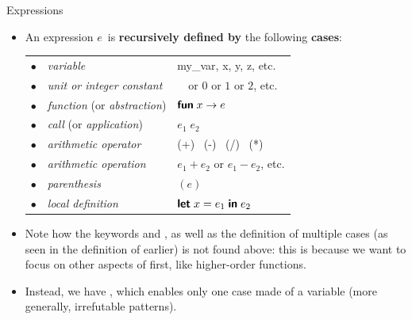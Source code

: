 %
\begin{frame}{Expressions}

  \begin{itemize}

    \item An expression \(e\)~is \textbf{recursively defined by} the
      following \textbf{cases}:

      \smallskip

      \begin{tabular}{@{\,}r@{\,\,}ll}
        $\bullet$
        & \emph{variable}
        & my\_var, x, y, z, etc. \\
        $\bullet$
        & \emph{unit or integer constant}
        & \unit \ or $0$ or $1$ or $2$, etc.\\
        $\bullet$
        & \emph{function} (or \emph{abstraction})
        & $\textsf{\textbf{fun}} \; x \rightarrow e$\\
        $\bullet$
        & \emph{call} (or \emph{application})
        & $e_1 \; e_2$ \\
        $\bullet$
        & \emph{arithmetic operator}
        & (+) \ (-) \ (/) \ (*)\\
        $\bullet$
        & \emph{arithmetic operation}
        & $e_1 + e_2$ or $e_1 - e_2$,
        etc.\\
        $\bullet$
        & \emph{parenthesis}
        & $(e)$\\
        $\bullet$
        & \emph{local definition}
        & $\textsf{\textbf{let}} \; x = e_1 \; \textsf{\textbf{in}} \; e_2$
      \end{tabular}

    \item Note how the keywords \Xrec and \Xfunction, as well as the
      definition of multiple cases (as seen in the definition of
       earlier) is not found above: this is because we want
      to focus on other aspects of \OCaml first, like
      higher\hyp{}order functions.

    \item Instead, we have \Xfun, which enables only one case made
      of a variable (more generally, irrefutable patterns).

  \end{itemize}

\end{frame}

